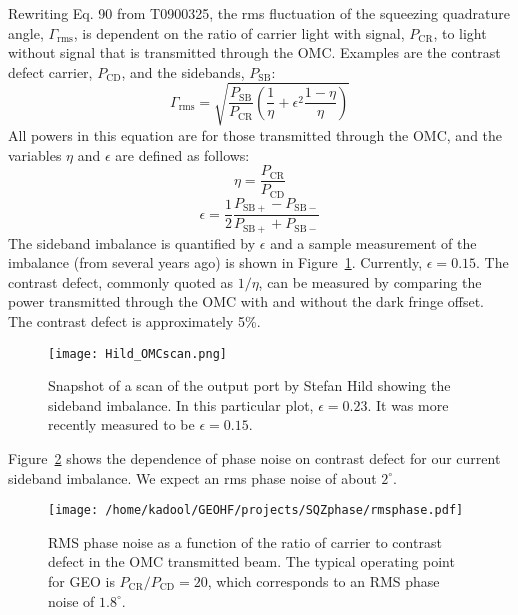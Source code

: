 \documentclass{ligodoc}
\begin{document}
Rewriting Eq. 90 from T0900325, the rms fluctuation of the squeezing
quadrature angle, $\Gamma_{\mathrm{rms}}$, is dependent on the ratio
of carrier light with signal, $P_{\mathrm{CR}}$, to light without
signal that is transmitted through the OMC. Examples are the contrast
defect carrier, $P_{\mathrm{CD}}$, and the sidebands, $P_{\mathrm{SB}}$:
\begin{equation}
\Gamma_{\mathrm{rms}} = \sqrt{\frac{P_{\mathrm{SB}}}{P_{\mathrm{CR}}} \left( \frac{1}{\eta} + \epsilon^2 \frac{1-\eta}{\eta} \right)}
\label{eq:Gammarms}
\end{equation}
All powers in this equation are for those transmitted through the OMC,
and the variables $\eta$ and $\epsilon$ are defined as follows:
\begin{equation}
\eta = \frac{P_{\mathrm{CR}}}{P_{\mathrm{CD}}}
\end{equation}
\begin{equation}
\epsilon = \frac{1}{2}\frac{P_{\mathrm{SB+}}-P_{\mathrm{SB-}}}{P_{\mathrm{SB+}}+P_{\mathrm{SB-}}}
\end{equation}
The sideband imbalance is quantified by $\epsilon$ and a sample
measurement of the imbalance (from several years ago) is shown in
Figure~\ref{fig:Hildscan}. Currently, $\epsilon=0.15$. The contrast
defect, commonly quoted as $1/\eta$, can be measured by comparing the
power transmitted through the OMC with and without the dark fringe
offset. The contrast defect is approximately 5\%.

\begin{figure}
\begin{centering}
\texttt{[image: Hild\_OMCscan.png]}
\caption{Snapshot of a scan of the output port by Stefan Hild showing
  the sideband imbalance. In this particular plot, $\epsilon=0.23$. It
  was more recently measured to be $\epsilon = 0.15$.}
\label{fig:Hildscan}
\end{centering}
\end{figure}

Figure~\ref{fig:phirms} shows the dependence of phase noise on
contrast defect for our current sideband imbalance. We expect an rms
phase noise of about $2^\circ$.

\begin{figure}
\begin{centering}
\texttt{[image: /home/kadool/GEOHF/projects/SQZphase/rmsphase.pdf]}
\caption{RMS phase noise as a function of the ratio of carrier to
  contrast defect in the OMC transmitted beam. The typical operating
  point for GEO is $P_{\mathrm{CR}}/P_{\mathrm{CD}}=20$, which
  corresponds to an RMS phase noise of $1.8^\circ$.}
\label{fig:phirms}
\end{centering}
\end{figure}
\end{document}
